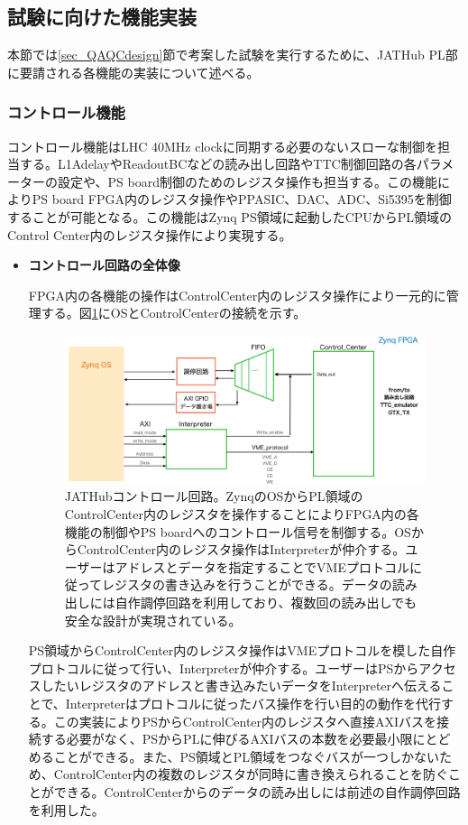 \subsection{試験に向けた機能実装}
\label{subsec_function}
本節では\ref{sec_QAQCdesign}節で考案した試験を実行するために、JATHub PL部に要請される各機能の実装について述べる。

\subsubsection{コントロール機能}
\label{subsubsec_control}
コントロール機能はLHC 40MHz clockに同期する必要のないスローな制御を担当する。L1AdelayやReadoutBCなどの読み出し回路やTTC制御回路の各パラメーターの設定や、PS board制御のためのレジスタ操作も担当する。この機能によりPS board FPGA内のレジスタ操作やPPASIC、DAC、ADC、Si5395を制御することが可能となる。この機能はZynq PS領域に起動したCPUからPL領域のControl Center内のレジスタ操作により実現する。

\begin{itemize}
\item{\textbf{コントロール回路の全体像}}

FPGA内の各機能の操作はControlCenter内のレジスタ操作により一元的に管理する。図\ref{JATHubccenter}にOSとControlCenterの接続を示す。

\begin{figure} 
\centering
\includegraphics[width=16cm]{fig/JATHubccenter.png}
\caption[JATHubコントロール回路]{JATHubコントロール回路。ZynqのOSからPL領域のControlCenter内のレジスタを操作することによりFPGA内の各機能の制御やPS boardへのコントロール信号を制御する。OSからControlCenter内のレジスタ操作はInterpreterが仲介する。ユーザーはアドレスとデータを指定することでVMEプロトコルに従ってレジスタの書き込みを行うことができる。データの読み出しには自作調停回路を利用しており、複数回の読み出しでも安全な設計が実現されている。}
\label{JATHubccenter}
\end{figure}

PS領域からControlCenter内のレジスタ操作はVMEプロトコルを模した自作プロトコルに従って行い、Interpreterが仲介する。ユーザーはPSからアクセスしたいレジスタのアドレスと書き込みたいデータをInterpreterへ伝えることで、Interpreterはプロトコルに従ったバス操作を行い目的の動作を代行する。この実装によりPSからControlCenter内のレジスタへ直接AXIバスを接続する必要がなく、PSからPLに伸びるAXIバスの本数を必要最小限にとどめることができる。また、PS領域とPL領域をつなぐバスが一つしかないため、ControlCenter内の複数のレジスタが同時に書き換えられることを防ぐことができる。ControlCenterからのデータの読み出しには前述の自作調停回路を利用した。
\baselineskip
\end{itemize}

